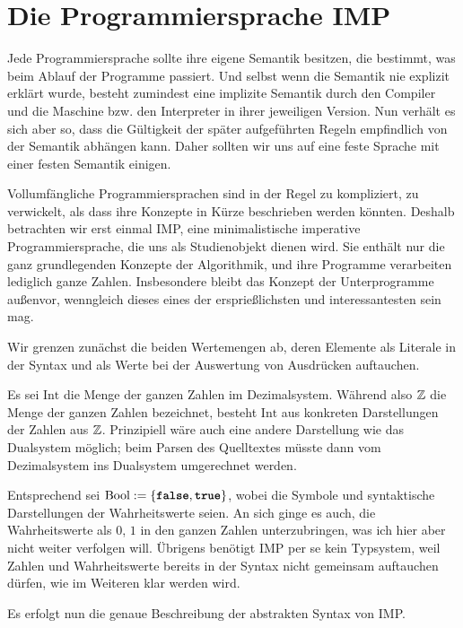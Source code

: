 \section{Die Programmiersprache IMP}

Jede Programmiersprache sollte ihre eigene Semantik besitzen, die bestimmt,
was beim Ablauf der Programme passiert. Und selbst wenn die Semantik nie
explizit erklärt wurde, besteht zumindest eine implizite Semantik durch
den Compiler und die Maschine bzw. den Interpreter in ihrer jeweiligen
Version. Nun verhält es sich aber so, dass die Gültigkeit der später
aufgeführten Regeln empfindlich von der Semantik abhängen kann. Daher
sollten wir uns auf eine feste Sprache mit einer festen Semantik einigen.

Vollumfängliche Programmiersprachen sind in der Regel zu kompliziert, zu
verwickelt, als dass ihre Konzepte in Kürze beschrieben werden könnten.
Deshalb betrachten wir erst einmal IMP, eine minimalistische imperative
Programmiersprache, die uns als Studienobjekt dienen wird. Sie enthält
nur die ganz grundlegenden Konzepte der Algorithmik, und ihre Programme
verarbeiten lediglich ganze Zahlen. Insbesondere bleibt das Konzept der
Unterprogramme außenvor, wenngleich dieses eines der ersprießlichsten
und interessantesten sein mag.

Wir grenzen zunächst die beiden Wertemengen ab, deren Elemente als Literale
in der Syntax und als Werte bei der Auswertung von Ausdrücken auftauchen.

Es sei $\mathrm{Int}$ die Menge der ganzen Zahlen im Dezimalsystem. Während
also $\mathbb Z$ die Menge der ganzen Zahlen bezeichnet, besteht $\mathrm{Int}$
aus konkreten Darstellungen der Zahlen aus $\mathbb Z$. Prinzipiell wäre auch
eine andere Darstellung wie das Dualsystem möglich; beim Parsen des
Quelltextes müsste dann vom Dezimalsystem ins Dualsystem umgerechnet werden.

Entsprechend sei $\mathrm{Bool}:=\{\kw{false},\kw{true}\}$, wobei die
Symbole  und  syntaktische Darstellungen der
Wahrheitswerte seien. An sich ginge es auch, die Wahrheitswerte als
$0$, $1$ in den ganzen Zahlen unterzubringen, was ich hier aber nicht weiter
verfolgen will. Übrigens benötigt IMP per se kein Typsystem, weil Zahlen
und Wahrheitswerte bereits in der Syntax nicht gemeinsam auftauchen
dürfen, wie im Weiteren klar werden wird.

Es erfolgt nun die genaue Beschreibung der abstrakten Syntax von IMP.

